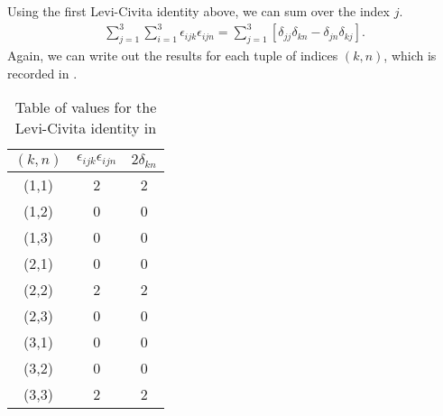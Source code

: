 
Using the first Levi-Civita identity above, we can sum over the index $j$.
\begin{eqnarray}
    \label{eq:sum-j}
    \sum_{j=1}^{3}\sum_{i=1}^{3} \epsilon_{ijk}\epsilon_{ijn} = \sum_{j=1}^{3} [\delta_{jj}\delta_{kn} - \delta_{jn}\delta_{kj}]
.\end{eqnarray}
Again, we can write out the results for each tuple of indices $(k,n)$, which is recorded in .
\begin{table}[H]
\begin{center}
    \begin{tabular}{ccc}
     \hline
    $(k,n)$ & $\epsilon_{ijk}\epsilon_{ijn}$ & $2\delta_{kn}$ \\
     \hline
     (1,1) & 2  & 2 \\
     (1,2) & 0  & 0 \\
     (1,3) & 0  & 0 \\
     (2,1) & 0  & 0 \\
     (2,2) & 2  & 2 \\
     (2,3) & 0  & 0 \\
     (3,1) & 0  & 0 \\
     (3,2) & 0  & 0 \\
     (3,3) & 2  & 2 \\
     \hline
   \end{tabular} 
\end{center} 
\caption{Table of values for the Levi-Civita identity in }
\label{tab:levi-civita-table-2}
\end{table}


